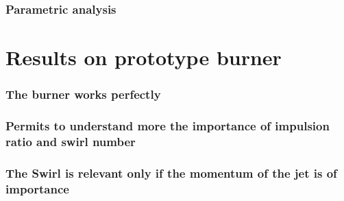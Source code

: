 \subsubsection{Parametric analysis}

\section{Results on prototype burner}
\subsubsection{The burner works perfectly}
\subsubsection{Permits to understand more the importance of impulsion ratio and swirl number}
\subsubsection{The Swirl is relevant only if the momentum of the jet is of importance}